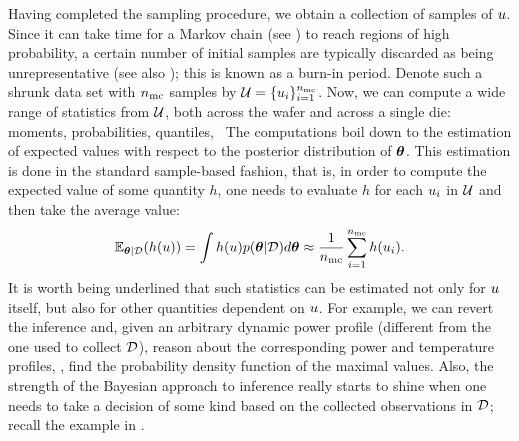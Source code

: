 Having completed the sampling procedure, we obtain a collection of samples of $u$. Since it can take time for a Markov chain (see ) to reach regions of high probability, a certain number of initial samples are typically discarded as being unrepresentative (see also ); this is known as a burn-in period. Denote such a shrunk data set with ${n_\text{mc}}$ samples by $\mathcal{U} = \{ u_i \}_{i = 1}^{n_\text{mc}}$. Now, we can compute a wide range of statistics from $\mathcal{U}$, both across the wafer and across a single die: moments, probabilities, quantiles, \etc\ The computations boil down to the estimation of expected values with respect to the posterior distribution of ${\boldsymbol\theta}$. This estimation is done in the standard sample-based fashion, that is, in order to compute the expected value of some quantity $h$, one needs to evaluate $h$ for each $u_i$ in $\mathcal{U}$ and then take the average value:
\[
  \E_{\vparam | \Data}(h(\u)) = \int h(\u) \f{\vparam | \Data} d\vparam \approx \frac{1}{\nsamples} \sum_{i = 1}^\nsamples h(\u_i).
\]
It is worth being underlined that such statistics can be estimated not only for $u$ itself, but also for other quantities dependent on $u$. For example, we can revert the inference and, given an arbitrary dynamic power profile (different from the one used to collect $\mathcal{D}$), reason about the corresponding power and temperature profiles, \eg, find the probability density function of the maximal values. Also, the strength of the Bayesian approach to inference really starts to shine when one needs to take a decision of some kind based on the collected observations in $\mathcal{D}$; recall the example in .
